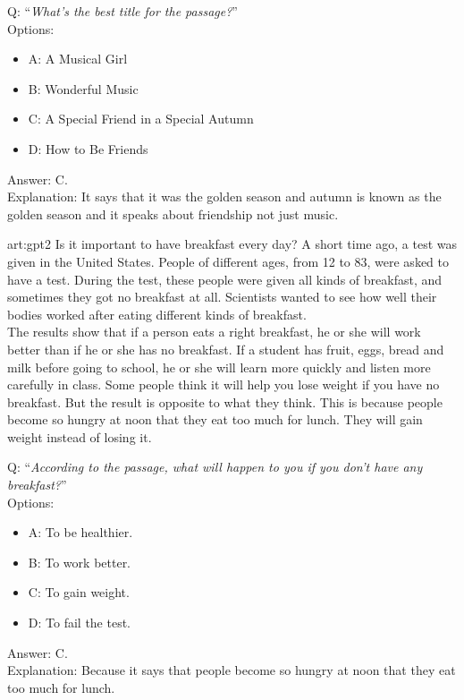 Q: ``\emph{What's the best title for the passage?}''\\
Options: 
\begin{itemize}
 \item A: A Musical Girl
 \item B: Wonderful Music
 \item C: A Special Friend in a Special Autumn
 \item D: How to Be Friends
\end{itemize}
Answer: C. \\
Explanation: It says that it was the golden season and autumn is known as the golden season and it speaks about friendship not just music.

\begin{passage}{art:gpt2}
 Is it important to have breakfast every day? A short time ago, a test was given in the United States. People of different ages, from 12 to 83, were asked to have a test. During the test, these people were given all kinds of breakfast, and sometimes they got no breakfast at all. Scientists wanted to see how well their bodies worked after eating different kinds of breakfast. \\
The results show that if a person eats a right breakfast, he or she will work better than if he or she has no breakfast. If a student has fruit, eggs, bread and milk before going to school, he or she will learn more quickly and listen more carefully in class. Some people think it will help you lose weight if you have no breakfast. But the result is opposite to what they think. This is because people become so hungry at noon that they eat too much for lunch. They will gain weight instead of losing it.
\end{passage}
Q: ``\emph{According to the passage, what will happen to you if you don't have any breakfast?}''\\
Options: 
\begin{itemize}
 \item A: To be healthier.
 \item B: To work better.
 \item C: To gain weight.
 \item D: To fail the test.
\end{itemize}
Answer: C. \\
Explanation: Because it says that people become so hungry at noon that they eat too much for lunch.

